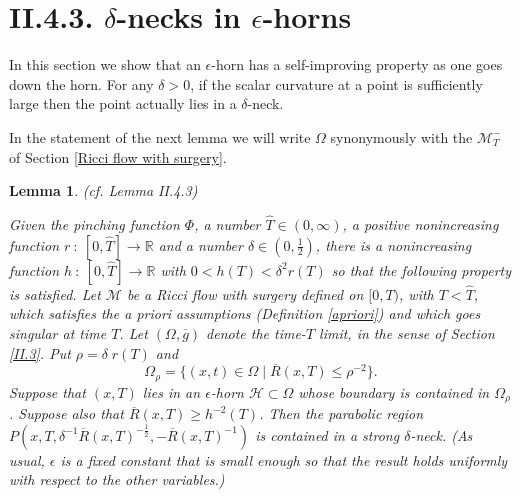 \documentclass[12pt]{amsart}
\newcommand{\h}{{\mathcal H}}
\newcommand{\M}{{\mathcal M}}
\newcommand{\Om}{\Omega}
\newcommand{\R}{{\mathbb R}}
\newcommand{\de}{\delta}
\newcommand{\eps}{\epsilon}
\newcommand{\ra}{\rightarrow}
\numberwithin{equation}{section}
\theoremstyle{plain}
\newtheorem{lemma}[equation]{Lemma}
\theoremstyle{definition}
\theoremstyle{remark}
\begin{document}
\section{II.4.3. $\delta$-necks in $\epsilon$-horns}

In this section we show that an $\epsilon$-horn has a
self-improving property as one goes down the horn.  
For any $\delta > 0$, if the scalar curvature at a point
is sufficiently large then the point actually lies in a
$\delta$-neck.


In the statement of the 
next lemma we will write $\Omega$
synonymously with the $\M_T^-$ of Section
\ref{Ricci flow with surgery}.

\begin{lemma}(cf. Lemma II.4.3) \label{lemmaII.4.3}
\label{hexists}

Given the pinching function $\Phi$, a number 
$\widehat{T} \in (0, \infty)$, a positive nonincreasing
function $r \: : \: [0, \widehat{T}] \rightarrow \R$ and a number $\delta \in
\left( 0, \frac12 \right)$,
there is a 
nonincreasing 
function $h\::\:[0,\widehat{T}]\ra \R$ with
$0 < h(T) < \delta^2 r(T)$ 
so that the following property is satisfied.  
Let
$\M$ be a Ricci flow with surgery defined on $[0, T)$, with $T < \widehat{T}$,
which satisfies the {\it a priori}
assumptions (Definition \ref{apriori}) and which goes singular
at time $T$. Let $(\Omega, \overline{g})$ denote the time-$T$ limit, in the sense of
Section \ref{II.3}.
Put $\rho = \de\; r(T)$ and
\begin{equation}
\Om_\rho=\{(x,t)\in \Omega \mid \overline{R}(x,T)\leq \rho^{-2}\}.
\end{equation}
\noindent
Suppose that $(x,T)$
lies in an $\eps$-horn $\h\subset \Omega$ whose boundary is contained in 
$\Om_\rho$.  
Suppose also that  $\overline{R}(x,T)\geq h^{-2}(T)$. 
Then the parabolic
region $P(x,T,\de^{-1}\overline{R}(x,T)^{-\frac12},-\overline{R}(x,T)^{-1})$ is
contained in a strong $\de$-neck. (As usual, $\epsilon$ is 
a fixed constant that is small enough so that the result holds
uniformly  with respect to the other variables.)
\end{lemma}
\end{document}
